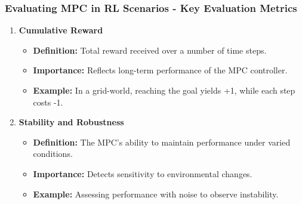 \documentclass[aspectratio=169]{beamer}
\begin{document}
\begin{frame}[fragile]
    \frametitle{Evaluating MPC in RL Scenarios - Key Evaluation Metrics}
    \begin{enumerate}
        \item \textbf{Cumulative Reward}
            \begin{itemize}
                \item \textbf{Definition:} Total reward received over a number of time steps.
                \item \textbf{Importance:} Reflects long-term performance of the MPC controller.
                \item \textbf{Example:} In a grid-world, reaching the goal yields +1, while each step costs -1.
            \end{itemize}
        \item \textbf{Stability and Robustness}
            \begin{itemize}
                \item \textbf{Definition:} The MPC's ability to maintain performance under varied conditions.
                \item \textbf{Importance:} Detects sensitivity to environmental changes.
                \item \textbf{Example:} Assessing performance with noise to observe instability.
            \end{itemize}
    \end{enumerate}
\end{frame}
\end{document}
